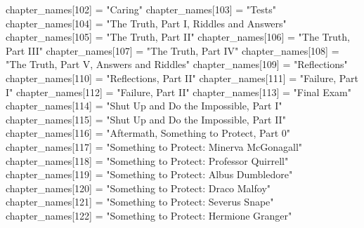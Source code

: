 {    chapter_names[102] = "Caring"
    chapter_names[103] = "Tests"
    chapter_names[104] = "The Truth, Part I, Riddles and Answers"
    chapter_names[105] = "The Truth, Part II"
    chapter_names[106] = "The Truth, Part III"
    chapter_names[107] = "The Truth, Part IV"
    chapter_names[108] = "The Truth, Part V, Answers and Riddles"
    chapter_names[109] = "Reflections"
    chapter_names[110] = "Reflections, Part II"
    chapter_names[111] = "Failure, Part I"
    chapter_names[112] = "Failure, Part II"
    chapter_names[113] = "Final Exam"
    chapter_names[114] = "Shut Up and Do the Impossible, Part I"
    chapter_names[115] = "Shut Up and Do the Impossible, Part II"
    chapter_names[116] = "Aftermath, Something to Protect, Part 0"
    chapter_names[117] = "Something to Protect: Minerva McGonagall"
    chapter_names[118] = "Something to Protect: Professor Quirrell"
    chapter_names[119] = "Something to Protect: Albus Dumbledore"
    chapter_names[120] = "Something to Protect: Draco Malfoy"
    chapter_names[121] = "Something to Protect: Severus Snape"
    chapter_names[122] = "Something to Protect: Hermione Granger"
}

\newcommand{\ChapterName}[1]{\directlua{tex.print(chapter_names[#1])}}

\newcommand{\ChapterNum}[1]{\directlua{%
    chapters = {\hpBookChapters}
    first_chap = chapters[1]
    extra = 0
    if \hpBookNo == 1 and #1 > 11 then
    extra = 1
    end
    tex.sprint(#1 - first_chap - extra + 1) -- add one because chapters start is inclusive
}}
